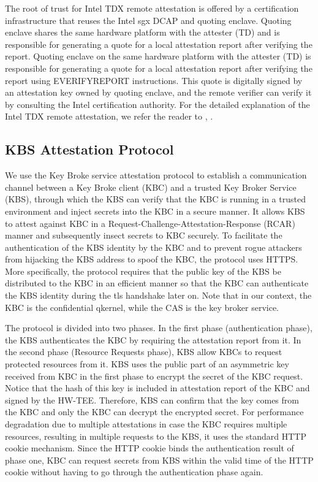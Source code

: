  
The root of trust for Intel TDX remote attestation is offered by a certification infrastructure that reuses the Intel sgx DCAP\cite*{Intel_DCAP} and quoting enclave\cite*{Intel_tdx_whitepaper}. Quoting enclave shares the same hardware 
platform with the attester (TD) and is responsible for generating a quote for a local attestation report after verifying the report. Quoting enclave on the same hardware platform with the 
attester (TD) is responsible for generating a quote for a local attestation report after verifying the report using EVERIFYREPORT instructions. This quote is digitally signed by an 
attestation key owned by quoting enclave, and the remote verifier can verify it by consulting the Intel certification authority. For the detailed explanation of the Intel TDX remote attestation, we refer the reader to \cite*{Intel_tdx_whitepaper}, \cite*{9448036}.


\subsection{KBS Attestation Protocol}

We use the Key Broke service attestation protocol to establish a communication channel between a Key Broke client (KBC) and a trusted Key Broker Service (KBS), 
through which the KBS can verify that the KBC is running in a trusted environment and inject secrets into the KBC in a secure manner. It allows KBS to attest against KBC in a Request-Challenge-Attestation-Response (RCAR) manner and subsequently insect secrets to KBC securely. 
To facilitate the authentication of the KBS identity by the KBC and to prevent rogue attackers from hijacking the KBS address to spoof the KBC, the protocol uses HTTPS. More specifically, the protocol requires that the public key of the KBS be distributed to the KBC in an efficient manner so that 
the KBC can authenticate the KBS identity during the tls handshake later on.  Note that in our context, the KBC is the confidential qkernel, while the CAS is the key broker service.

The protocol is divided into two phases. In the first phase (authentication phase), the KBS authenticates the KBC by requiring the attestation report from it. In the second phase (Resource Requests phase), KBS allow KBCs to request protected resources from it. 
KBS uses the public part of an asymmetric key received from KBC in the first phase to encrypt the secret of the KBC request. Notice that the hash of this key is included in attestation report of the KBC and signed by the HW-TEE. Therefore, KBS 
can confirm that the key comes from the KBC and only the KBC can decrypt the encrypted secret. For performance degradation due to multiple attestations in case the KBC requires multiple resources, resulting in multiple requests to the KBS, 
it uses the standard HTTP cookie mechanism.  Since the HTTP cookie binds the authentication result of phase one, KBC can request secrets from KBS within the valid time of the HTTP cookie without having to go through the authentication phase again.

